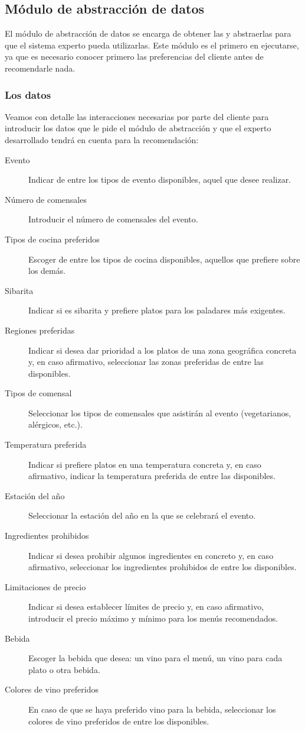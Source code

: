 % 

\subsection{Módulo de abstracción de datos}
El módulo de abstracción de datos se encarga de obtener las  y abstraerlas para que el sistema experto
pueda utilizarlas. Este módulo es el primero en ejecutarse, ya que es necesario conocer primero las preferencias del cliente
antes de recomendarle nada.

\subsubsection{Los datos}
Veamos con detalle las interacciones necesarias por parte del cliente para introducir los datos que le pide el módulo de abstracción
y que el experto desarrollado tendrá en cuenta para la recomendación:

\begin{description}
\item[Evento] Indicar de entre los tipos de evento disponibles, aquel que desee realizar.
\item[Número de comensales] Introducir el número de comensales del evento.
\item[Tipos de cocina preferidos] Escoger de entre los tipos de cocina disponibles, aquellos que prefiere sobre los demás.
\item[Sibarita] Indicar si es sibarita y prefiere platos para los paladares más exigentes.
\item[Regiones preferidas] Indicar si desea dar prioridad a los platos de una zona geográfica concreta y, en caso afirmativo, seleccionar
las zonas preferidas de entre las disponibles.
\item[Tipos de comensal] Seleccionar los tipos de comensales que asistirán al evento (vegetarianos, alérgicos, etc.).
\item[Temperatura preferida] Indicar si prefiere platos en una temperatura concreta y, en caso afirmativo, indicar la temperatura preferida de entre las disponibles.
\item[Estación del año] Seleccionar la estación del año en la que se celebrará el evento.
\item[Ingredientes prohibidos] Indicar si desea prohibir algunos ingredientes en concreto y, en caso afirmativo, seleccionar los
ingredientes prohibidos de entre los disponibles.
\item[Limitaciones de precio] Indicar si desea establecer límites de precio y, en caso afirmativo, introducir el precio máximo y
mínimo para los menús recomendados.
\item[Bebida] Escoger la bebida que desea: un vino para el menú, un vino para cada plato o otra bebida.
\item[Colores de vino preferidos] En caso de que se haya preferido vino para la bebida, seleccionar los colores de vino preferidos de
entre los disponibles.
\end{description}

